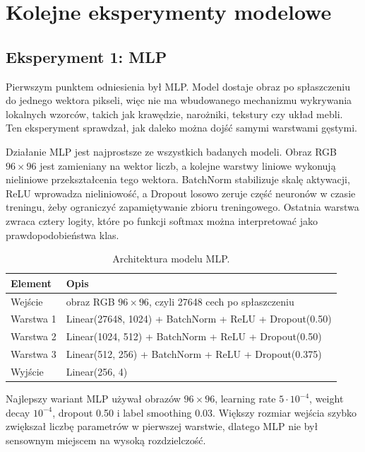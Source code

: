 \documentclass[12pt,a4paper]{article}
\begin{document}
\section{Kolejne eksperymenty modelowe}

\subsection{Eksperyment 1: MLP}

Pierwszym punktem odniesienia był MLP. Model dostaje obraz po spłaszczeniu do jednego wektora pikseli, więc nie ma wbudowanego mechanizmu wykrywania lokalnych wzorców, takich jak krawędzie, narożniki, tekstury czy układ mebli. Ten eksperyment sprawdzał, jak daleko można dojść samymi warstwami gęstymi.

Działanie MLP jest najprostsze ze wszystkich badanych modeli. Obraz RGB \(96 \times 96\) jest zamieniany na wektor liczb, a kolejne warstwy liniowe wykonują nieliniowe przekształcenia tego wektora. BatchNorm stabilizuje skalę aktywacji, ReLU wprowadza nieliniowość, a Dropout losowo zeruje część neuronów w czasie treningu, żeby ograniczyć zapamiętywanie zbioru treningowego. Ostatnia warstwa zwraca cztery logity, które po funkcji softmax można interpretować jako prawdopodobieństwa klas.

\begin{table}[H]
\centering
\caption{Architektura modelu MLP.}
\label{tab:mlp_arch}
\begin{tabular}{ll}
\toprule
Element & Opis \\
\midrule
Wejście & obraz RGB \(96 \times 96\), czyli 27648 cech po spłaszczeniu \\
Warstwa 1 & Linear(27648, 1024) + BatchNorm + ReLU + Dropout(0.50) \\
Warstwa 2 & Linear(1024, 512) + BatchNorm + ReLU + Dropout(0.50) \\
Warstwa 3 & Linear(512, 256) + BatchNorm + ReLU + Dropout(0.375) \\
Wyjście & Linear(256, 4) \\
\bottomrule
\end{tabular}
\end{table}

Najlepszy wariant MLP używał obrazów \(96 \times 96\), learning rate \(5 \cdot 10^{-4}\), weight decay \(10^{-4}\), dropout 0.50 i label smoothing 0.03. Większy rozmiar wejścia szybko zwiększał liczbę parametrów w pierwszej warstwie, dlatego MLP nie był sensownym miejscem na wysoką rozdzielczość.
\end{document}
